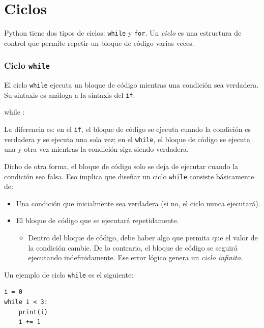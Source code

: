 \part{Ciclos}

Python tiene dos tipos de ciclos: \texttt{while} y \texttt{for}. Un \emph{ciclo} es una estructura de control que permite repetir un bloque de código varias veces.

\section{Ciclo \texttt{while}}

El ciclo \texttt{while} ejecuta un bloque de código mientras una condición sea verdadera. Su sintaxis es análoga a la sintaxis del \texttt{if}:

\begin{sintaxis}
while :\\
\phantom{xxxx}
\end{sintaxis}

La diferencia es: en el \texttt{if}, el bloque de código se ejecuta cuando la condición es verdadera y se ejecuta una sola vez; en el \texttt{while}, el bloque de código se ejecuta una y otra vez mientras la condición siga siendo verdadera.

Dicho de otra forma, el bloque de código solo se deja de ejecutar cuando la condición sea falsa. Eso implica que diseñar un ciclo \texttt{while} consiste básicamente de:
\begin{itemize}
    \item Una condición que inicialmente sea verdadera (si no, el ciclo nunca ejecutará).
    \item El bloque de código que se ejecutará repetidamente.
    \begin{itemize}
        \item Dentro del bloque de código, debe haber algo que permita que el valor de la condición cambie. De lo contrario, el bloque de código se seguirá ejecutando indefinidamente. Ese error lógico genera un \textit{ciclo infinito}.
    \end{itemize}
\end{itemize}

Un ejemplo de ciclo \texttt{while} es el siguiente:
\begin{verbatim}
i = 0
while i < 3:
    print(i)
    i += 1
\end{verbatim}


